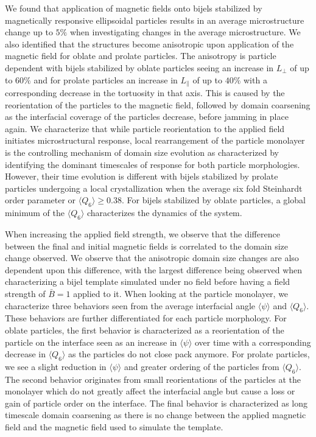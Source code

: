 We found that application of magnetic fields onto bijels stabilized by magnetically responsive ellipsoidal particles results in an average microstructure change up to 
$5\%$ when investigating changes in the average microstructure. We also identified that the structures become anisotropic upon application of the magnetic field for 
oblate and prolate particles. The anisotropy is particle dependent with bijels stabilized by oblate particles seeing an increase in $L_{\perp}$ of up to $60\%$ and for 
prolate particles an increase in $L_{\parallel}$ of up to $40\%$ with a corresponding decrease in the tortuosity in that axis. This is caused by the reorientation of the 
particles to the magnetic field, followed by domain coarsening as the interfacial coverage of the particles decrease, before jamming in place again. We characterize that 
while particle reorientation to the applied field initiates microstructural response, local rearrangement of the particle monolayer is the controlling mechanism of 
domain size evolution as characterized by identifying the dominant timescales 
of response for both particle morphologies. However, their time evolution is different with bijels stabilized by prolate particles undergoing a local crystallization when 
the average six fold Steinhardt order parameter or $\langle Q_6 \rangle \geq 0.38$. For bijels stabilized by oblate particles, a global minimum of the $\langle Q_6 \rangle$ 
characterizes the dynamics of the system.

When increasing the applied field strength, we observe that the difference between the final and initial magnetic fields is correlated to the domain size change observed. 
We observe that the anisotropic domain size changes are also dependent upon this difference, with the largest difference being observed when characterizing a bijel template 
simulated under no field before having a field strength of $\bar{B} = 1$ applied to it. When looking at the particle monolayer, we characterize three behaviors seen from the 
average interfacial angle $\langle \psi \rangle$ and $\langle Q_6 \rangle$. These behaviors are further differentiated for each particle morphology. For oblate particles, 
the first behavior is characterized as a reorientation of the particle on the interface seen as an increase in $\langle \psi \rangle$ over time with a corresponding decrease 
in $\langle Q_6 \rangle$ as the particles do not close pack anymore. For prolate particles, we see a slight reduction in $\langle \psi \rangle$ and greater ordering of the 
particles from $\langle Q_6 \rangle$. The second behavior originates from small reorientations of the particles at the monolayer which do not greatly affect the interfacial 
angle but cause a loss or gain of particle order on the interface. The final behavior is characterized as long timescale domain coarsening as there is no change between the 
applied magnetic field and the magnetic field used to simulate the template.

